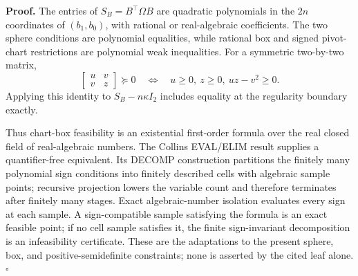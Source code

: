 \textbf{Proof.}
The entries of \(S_B=B^{\top}\Omega B\) are quadratic polynomials in the \(2n\) coordinates of \((b_1,b_0)\), with rational or real-algebraic coefficients.  The two sphere conditions are polynomial equalities, while rational box and signed pivot-chart restrictions are polynomial weak inequalities.  For a symmetric two-by-two matrix,
\[
 \begin{bmatrix}u&v\\v&z\end{bmatrix}\succeq0
 \quad\Longleftrightarrow\quad
 u\ge0,\ z\ge0,\ uz-v^2\ge0.
\]
Applying this identity to \(S_B-n\kappa I_2\) includes equality at the regularity boundary exactly.

Thus chart-box feasibility is an existential first-order formula over the real closed field of real-algebraic numbers.  The Collins EVAL/ELIM result supplies a quantifier-free equivalent.  Its DECOMP construction partitions the finitely many polynomial sign conditions into finitely described cells with algebraic sample points; recursive projection lowers the variable count and therefore terminates after finitely many stages.  Exact algebraic-number isolation evaluates every sign at each sample.  A sign-compatible sample satisfying the formula is an exact feasible point; if no cell sample satisfies it, the finite sign-invariant decomposition is an infeasibility certificate.  These are the adaptations to the present sphere, box, and positive-semidefinite constraints; none is asserted by the cited leaf alone. \(\square\)
